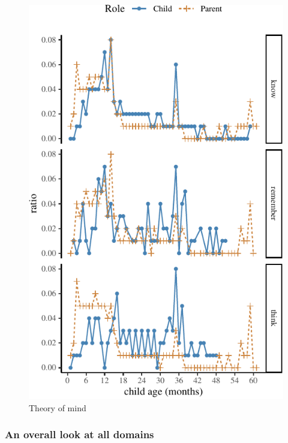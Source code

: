 \documentclass[10pt, letterpaper]{article}
\newenvironment{CodeChunk}{}{}
\begin{document}
\begin{CodeChunk}
\begin{figure}[H]

{\centering \includegraphics{figs/epistemic-1} 

}

\caption[Theory of mind]{Theory of mind}\label{fig:epistemic}
\end{figure}
\end{CodeChunk}

\hypertarget{an-overall-look-at-all-domains}{%
\subsubsection{An overall look at all
domains}\label{an-overall-look-at-all-domains}}
\end{document}
